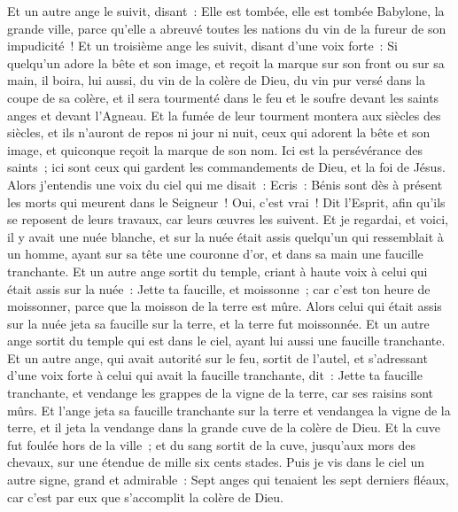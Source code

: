 \begin{multicols}{2}
Et un autre ange le suivit, disant~: Elle est tombée, elle est tombée Babylone, la grande ville, parce qu'elle a abreuvé toutes les nations du vin de la fureur de son impudicité~!
Et un troisième ange les suivit, disant d'une voix forte~: Si quelqu'un adore la bête et son image, et reçoit la marque sur son front ou sur sa main,
il boira, lui aussi, du vin de la colère de Dieu, du vin pur versé dans la coupe de sa colère, et il sera tourmenté dans le feu et le soufre devant les saints anges et devant l'Agneau.
Et la fumée de leur tourment montera aux siècles des siècles, et ils n'auront de repos ni jour ni nuit, ceux qui adorent la bête et son image, et quiconque reçoit la marque de son nom.
Ici est la persévérance des saints~; ici sont ceux qui gardent les commandements de Dieu, et la foi de Jésus.
Alors j'entendis une voix du ciel qui me disait~: Ecris~: Bénis sont dès à présent les morts qui meurent dans le Seigneur~! Oui, c'est vrai~! Dit l'Esprit, afin qu'ils se reposent de leurs travaux, car leurs œuvres les suivent.
Et je regardai, et voici, il y avait une nuée blanche, et sur la nuée était assis quelqu'un qui ressemblait à un homme, ayant sur sa tête une couronne d'or, et dans sa main une faucille tranchante.
Et un autre ange sortit du temple, criant à haute voix à celui qui était assis sur la nuée~: Jette ta faucille, et moissonne~; car c'est ton heure de moissonner, parce que la moisson de la terre est mûre.
Alors celui qui était assis sur la nuée jeta sa faucille sur la terre, et la terre fut moissonnée.
Et un autre ange sortit du temple qui est dans le ciel, ayant lui aussi une faucille tranchante.
Et un autre ange, qui avait autorité sur le feu, sortit de l'autel, et s'adressant d'une voix forte à celui qui avait la faucille tranchante, dit~: Jette ta faucille tranchante, et vendange les grappes de la vigne de la terre, car ses raisins sont mûrs.
Et l'ange jeta sa faucille tranchante sur la terre et vendangea la vigne de la terre, et il jeta la vendange dans la grande cuve de la colère de Dieu.
Et la cuve fut foulée hors de la ville~; et du sang sortit de la cuve, jusqu'aux mors des chevaux, sur une étendue de mille six cents stades.
\VerseOne{}Puis je vis dans le ciel un autre signe, grand et admirable~: Sept anges qui tenaient les sept derniers fléaux, car c'est par eux que s'accomplit la colère de Dieu.

\end{multicols}
